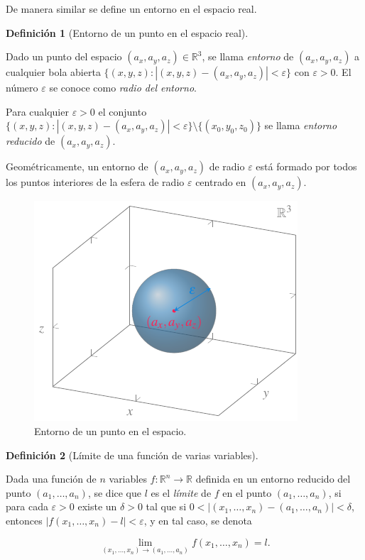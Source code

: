 \documentclass[
  a4paper,
]{scrreport}
\theoremstyle{plain}
\theoremstyle{plain}
\theoremstyle{definition}
\newtheorem{definition}{Definición}[chapter]
\theoremstyle{definition}
\theoremstyle{plain}
\theoremstyle{definition}
\theoremstyle{remark}
\begin{document}
De manera similar se define un entorno en el espacio real.

\begin{definition}[Entorno de un punto en el espacio
real]\protect\hypertarget{def-entorno-punto-espacio}{}\label{def-entorno-punto-espacio}

Dado un punto del espacio \((a_x,a_y,a_z)\in \mathbb{R}^3\), se llama
\emph{entorno} de \((a_x,a_y,a_z)\) a cualquier bola abierta
\(\{(x,y,z):|(x,y,z)-(a_x,a_y,a_z)|<\varepsilon\}\) con
\(\varepsilon>0\). El número \(\varepsilon\) se conoce como \emph{radio
del entorno}.

Para cualquier \(\varepsilon>0\) el conjunto
\(\{(x,y,z):|(x,y,z)-(a_x,a_y,a_z)|<\varepsilon\}\setminus \{(x_0,y_0,z_0)\}\)
se llama \emph{entorno reducido} de \((a_x,a_y,a_z)\).

\end{definition}

Geométricamente, un entorno de \((a_x,a_y,a_z)\) de radio
\(\varepsilon\) está formado por todos los puntos interiores de la
esfera de radio \(\varepsilon\) centrado en \((a_x,a_y,a_z)\).

\begin{figure}

{\centering \includegraphics{img/derivadas-funciones-varias-variables/entorno-punto-espacio.pdf}

}

\caption{Entorno de un punto en el espacio.}

\end{figure}

\begin{definition}[Límite de una función de varias
variables]\protect\hypertarget{def-limite-funcion-varias-variables}{}\label{def-limite-funcion-varias-variables}

Dada una función de \(n\) variables
\(f:\mathbb{R}^n\rightarrow \mathbb{R}\) definida en un entorno reducido
del punto \((a_1, \ldots, a_n)\), se dice que \(l\) es el \emph{límite}
de \(f\) en el punto \((a_1, \ldots, a_n)\), si para cada
\(\varepsilon>0\) existe un \(\delta>0\) tal que si
\(0<|(x_1,\ldots,x_n)-(a_1,\ldots,a_n)|<\delta\), entonces
\(|f(x_1,\ldots,x_n)-l|<\varepsilon\), y en tal caso, se denota

\[
\lim_{(x_1,\ldots,x_n)\rightarrow (a_1,\ldots,a_n)}f(x_1,\ldots,x_n) = l.
\]

\end{definition}
\end{document}
